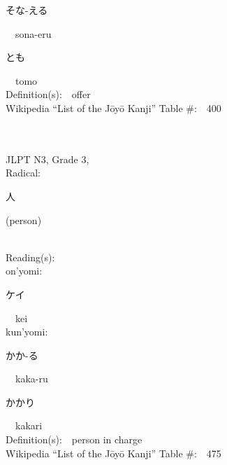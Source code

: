 \begin{multicols}{2}
{\hspace*{2em}}{\begin{CJK}{UTF8}{min} そな-える \end{CJK}}\ \ sona-eru\ \ \\
{\hspace*{2em}}{\begin{CJK}{UTF8}{min} とも \end{CJK}}\ \ tomo\ \ \\
Definition(s):\ \ offer \\
Wikipedia ``List of the J\=oy\=o Kanji'' Table \#:\ \ 400 \\
\ \ \\
{\fontsize{34pt}{40pt}  }\ \ \\  %
{JLPT N3, Grade 3, \\Radical:\ \ {\begin{CJK}{UTF8}{min} 人 \end{CJK}} (person) } \\
Reading(s):\ \ \\
{\hspace*{1em}}on'yomi:\ \ \\
{\hspace*{2em}}{\begin{CJK}{UTF8}{min} ケイ \end{CJK}}\ \ kei\ \ \\
{\hspace*{1em}}kun'yomi:\ \ \\
{\hspace*{2em}}{\begin{CJK}{UTF8}{min} かか-る \end{CJK}}\ \ kaka-ru\ \ \\
{\hspace*{2em}}{\begin{CJK}{UTF8}{min} かかり \end{CJK}}\ \ kakari\ \ \\
Definition(s):\ \ person in charge \\
Wikipedia ``List of the J\=oy\=o Kanji'' Table \#:\ \ 475 \\
\ \ \\
{\fontsize{34pt}{40pt}  }\ \ \\  %

\end{multicols}
